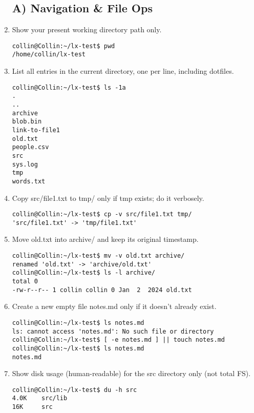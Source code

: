 \begin{enumerate}
\subsection*{A) Navigation \& File Ops}
    \item Show your present working directory path only.
    \begin{verbatim}
collin@Collin:~/lx-test$ pwd
/home/collin/lx-test
    \end{verbatim}
    \item List all entries in the current directory, one per line, including dotfiles.
    \begin{verbatim}
collin@Collin:~/lx-test$ ls -1a
.
..
archive
blob.bin
link-to-file1
old.txt
people.csv
src
sys.log
tmp
words.txt
    \end{verbatim}  
    \item Copy src/file1.txt to tmp/ only if tmp exists; do it verbosely.
    \begin{verbatim}
collin@Collin:~/lx-test$ cp -v src/file1.txt tmp/
'src/file1.txt' -> 'tmp/file1.txt'
    \end{verbatim}
    \item Move old.txt into archive/ and keep its original timestamp.
    \begin{verbatim}
collin@Collin:~/lx-test$ mv -v old.txt archive/
renamed 'old.txt' -> 'archive/old.txt'
collin@Collin:~/lx-test$ ls -l archive/
total 0
-rw-r--r-- 1 collin collin 0 Jan  2  2024 old.txt
    \end{verbatim}
    \item Create a new empty file notes.md only if it doesn’t already exist.
    \begin{verbatim}
collin@Collin:~/lx-test$ ls notes.md
ls: cannot access 'notes.md': No such file or directory
collin@Collin:~/lx-test$ [ -e notes.md ] || touch notes.md
collin@Collin:~/lx-test$ ls notes.md
notes.md
    \end{verbatim}
    \item Show disk usage (human-readable) for the src directory only (not total FS).
    \begin{verbatim}
collin@Collin:~/lx-test$ du -h src
4.0K    src/lib
16K     src
    \end{verbatim}
    

\end{enumerate}
